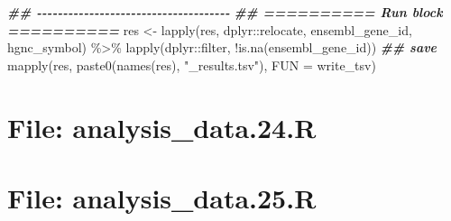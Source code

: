\documentclass[
]{article}
\newenvironment{Shaded}{\begin{snugshade}}{\end{snugshade}}
\newcommand{\AttributeTok}[1]{\textcolor[rgb]{0.77,0.63,0.00}{#1}}
\newcommand{\DecValTok}[1]{\textcolor[rgb]{0.00,0.00,0.81}{#1}}
\newcommand{\DocumentationTok}[1]{\textcolor[rgb]{0.56,0.35,0.01}{\textbf{\textit{#1}}}}
\newcommand{\FunctionTok}[1]{\textcolor[rgb]{0.00,0.00,0.00}{#1}}
\newcommand{\NormalTok}[1]{#1}
\newcommand{\OtherTok}[1]{\textcolor[rgb]{0.56,0.35,0.01}{#1}}
\newcommand{\SpecialCharTok}[1]{\textcolor[rgb]{0.00,0.00,0.00}{#1}}
\newcommand{\StringTok}[1]{\textcolor[rgb]{0.31,0.60,0.02}{#1}}
\begin{document}
\begin{Shaded}
\begin{Highlighting}[]
\DocumentationTok{\#\# {-}{-}{-}{-}{-}{-}{-}{-}{-}{-}{-}{-}{-}{-}{-}{-}{-}{-}{-}{-}{-}{-}{-}{-}{-}{-}{-}{-}{-}{-}{-}{-}{-}{-}{-}{-}{-} }
\DocumentationTok{\#\# ========== Run block ========== }
\NormalTok{res }\OtherTok{\textless{}{-}} \FunctionTok{lapply}\NormalTok{(res, dplyr}\SpecialCharTok{::}\NormalTok{relocate, ensembl\_gene\_id, hgnc\_symbol) }\SpecialCharTok{\%\textgreater{}\%} 
  \FunctionTok{lapply}\NormalTok{(dplyr}\SpecialCharTok{::}\NormalTok{filter, }\SpecialCharTok{!}\FunctionTok{is.na}\NormalTok{(ensembl\_gene\_id))}
\DocumentationTok{\#\# save}
\FunctionTok{mapply}\NormalTok{(res, }\FunctionTok{paste0}\NormalTok{(}\FunctionTok{names}\NormalTok{(res), }\StringTok{"\_results.tsv"}\NormalTok{), }\AttributeTok{FUN =}\NormalTok{ write\_tsv)}
\end{Highlighting}
\end{Shaded}

\hypertarget{file-analysis_data.24.r}{%
\section{File: analysis\_data.24.R}\label{file-analysis_data.24.r}}

\begin{Shaded}
\end{Shaded}

\hypertarget{file-analysis_data.25.r}{%
\section{File: analysis\_data.25.R}\label{file-analysis_data.25.r}}

\begin{Shaded}
\end{Shaded}
\end{document}
